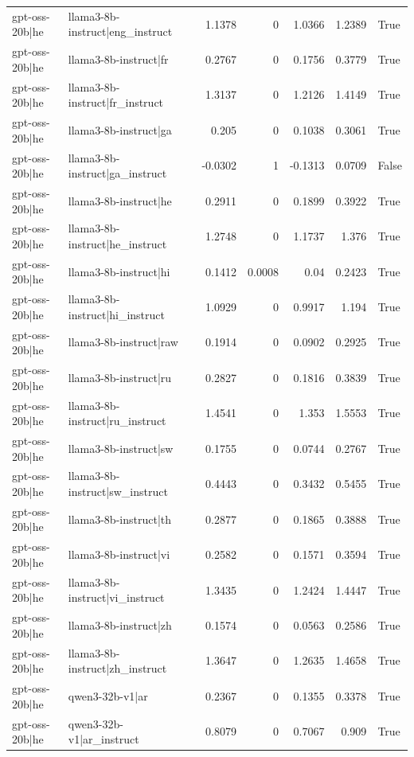\begin{table}
\begin{tabular}{l l r r r r l}
gpt-oss-20b|he & llama3-8b-instruct|eng_instruct & 1.1378 & 0 & 1.0366 & 1.2389 & True \\
gpt-oss-20b|he & llama3-8b-instruct|fr & 0.2767 & 0 & 0.1756 & 0.3779 & True \\
gpt-oss-20b|he & llama3-8b-instruct|fr_instruct & 1.3137 & 0 & 1.2126 & 1.4149 & True \\
gpt-oss-20b|he & llama3-8b-instruct|ga & 0.205 & 0 & 0.1038 & 0.3061 & True \\
gpt-oss-20b|he & llama3-8b-instruct|ga_instruct & -0.0302 & 1 & -0.1313 & 0.0709 & False \\
gpt-oss-20b|he & llama3-8b-instruct|he & 0.2911 & 0 & 0.1899 & 0.3922 & True \\
gpt-oss-20b|he & llama3-8b-instruct|he_instruct & 1.2748 & 0 & 1.1737 & 1.376 & True \\
gpt-oss-20b|he & llama3-8b-instruct|hi & 0.1412 & 0.0008 & 0.04 & 0.2423 & True \\
gpt-oss-20b|he & llama3-8b-instruct|hi_instruct & 1.0929 & 0 & 0.9917 & 1.194 & True \\
gpt-oss-20b|he & llama3-8b-instruct|raw & 0.1914 & 0 & 0.0902 & 0.2925 & True \\
gpt-oss-20b|he & llama3-8b-instruct|ru & 0.2827 & 0 & 0.1816 & 0.3839 & True \\
gpt-oss-20b|he & llama3-8b-instruct|ru_instruct & 1.4541 & 0 & 1.353 & 1.5553 & True \\
gpt-oss-20b|he & llama3-8b-instruct|sw & 0.1755 & 0 & 0.0744 & 0.2767 & True \\
gpt-oss-20b|he & llama3-8b-instruct|sw_instruct & 0.4443 & 0 & 0.3432 & 0.5455 & True \\
gpt-oss-20b|he & llama3-8b-instruct|th & 0.2877 & 0 & 0.1865 & 0.3888 & True \\
gpt-oss-20b|he & llama3-8b-instruct|vi & 0.2582 & 0 & 0.1571 & 0.3594 & True \\
gpt-oss-20b|he & llama3-8b-instruct|vi_instruct & 1.3435 & 0 & 1.2424 & 1.4447 & True \\
gpt-oss-20b|he & llama3-8b-instruct|zh & 0.1574 & 0 & 0.0563 & 0.2586 & True \\
gpt-oss-20b|he & llama3-8b-instruct|zh_instruct & 1.3647 & 0 & 1.2635 & 1.4658 & True \\
gpt-oss-20b|he & qwen3-32b-v1|ar & 0.2367 & 0 & 0.1355 & 0.3378 & True \\
gpt-oss-20b|he & qwen3-32b-v1|ar_instruct & 0.8079 & 0 & 0.7067 & 0.909 & True \\

\end{tabular}
\end{table}
